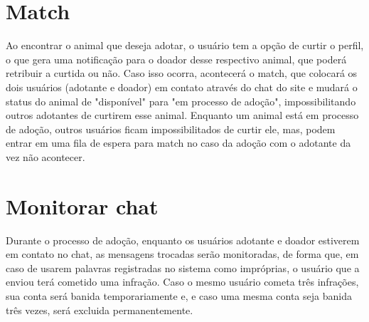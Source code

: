 \section{Match}
Ao encontrar o animal que deseja adotar, o usuário tem a opção de curtir o perfil, o que gera uma notificação para o doador desse respectivo animal, que poderá retribuir a curtida ou não. Caso isso ocorra, acontecerá o match, que colocará os dois usuários (adotante e doador) em contato através do chat do site e mudará o status do animal de "disponível" para "em processo de adoção", impossibilitando outros adotantes de curtirem esse animal.
Enquanto um animal está em processo de adoção, outros usuários ficam impossibilitados de curtir ele, mas, podem entrar em uma fila de espera para match no caso da adoção com o adotante da vez não acontecer.

\section{Monitorar chat}
Durante o processo de adoção, enquanto os usuários adotante e doador estiverem em contato no chat, as mensagens trocadas serão monitoradas, de forma que, em caso de usarem palavras registradas no sistema como impróprias, o usuário que a enviou terá cometido uma infração. Caso o mesmo usuário cometa três infrações, sua conta será banida temporariamente e, e caso uma mesma conta seja banida três vezes, será excluida permanentemente.



